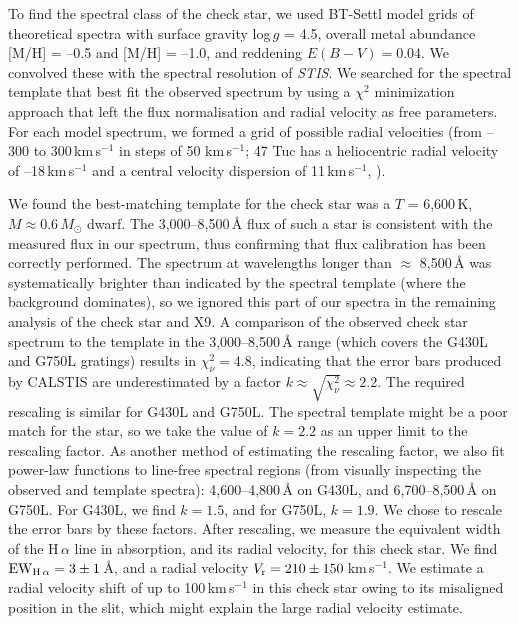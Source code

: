 \documentclass[a4paper,fleqn,usenatbib]{mnras}
\begin{document}
To find the spectral class of the check star, we used BT-Settl model grids of theoretical spectra \citep{2012RSPTA.370.2765A} with surface gravity log\,$g$ = 4.5, overall metal abundance [M/H] = --0.5 and [M/H] = --1.0, and reddening $E(B-V) = 0.04$. We convolved these with the spectral resolution of {\it STIS}. We searched for the spectral template that best fit the observed spectrum by using a $\chi^2$ minimization approach that left the flux normalisation and radial velocity as free parameters. For each model spectrum, we formed a grid of possible radial velocities (from --300 to 300\,km\,s$^{-1}$ in steps of 50 km\,s$^{-1}$; 47 Tuc has a heliocentric radial velocity of --18\,km\,s$^{-1}$ and a central velocity dispersion of 11\,km\,s$^{-1}$, \citealp{1996AJ....112.1487H}).

We found the best-matching template for the check star was a $T$ = 6,600\,K, $M \approx 0.6\,M_\odot$ dwarf. The 3,000--8,500\,{\AA} flux of such a star is consistent with the measured flux in our spectrum, thus confirming that flux calibration has been correctly performed. The spectrum at wavelengths longer than $\approx$ 8,500\,{\AA} was systematically brighter than indicated by the spectral template (where the background dominates), so we ignored this part of our spectra in the remaining analysis of the check star and X9. A comparison of the observed check star spectrum to the template in the 3,000--8,500\,{\AA} range (which covers the G430L and G750L gratings) results in $\chi_\nu^2 = 4.8$, indicating that the error bars produced by CALSTIS are underestimated by a factor $k \approx \sqrt{\chi_\nu^2} \approx 2.2$. The required rescaling is similar for G430L and G750L. The spectral template might be a poor match for the star, so we take the value of $k = 2.2$ as an upper limit to the rescaling factor. As another method of estimating the rescaling factor, we also fit power-law functions to line-free spectral regions (from visually inspecting the observed and template spectra): 4,600--4,800\,{\AA} on G430L, and 6,700--8,500\,{\AA} on G750L. For G430L, we find $k = 1.5$, and for G750L, $k = 1.9$. We chose to rescale the error bars by these factors. After rescaling, we measure the equivalent width of the H\,$\alpha$ line in absorption, and its radial velocity, for this check star. We find $\rm EW_{H\,\alpha} = 3 \pm 1$\,{\AA}, and a radial velocity $V_{\rm r} = 210 \pm 150$\,km\,s$^{-1}$. We estimate a radial velocity shift of up to 100\,km\,s$^{-1}$ in this check star owing to its misaligned position in the slit, which might explain the large radial velocity estimate.
\end{document}
